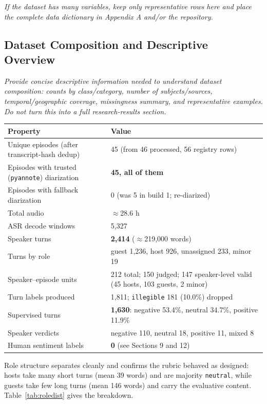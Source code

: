 \documentclass[11pt,a4paper]{article}
\newcommand{\thd}[1]{\textbf{\sffamily\small #1}}          %
\begin{document}
\emph{\small If the dataset has many variables, keep only representative rows here and place the
complete data dictionary in Appendix A and/or the repository.}

\subsection{Dataset Composition and Descriptive Overview}

\emph{\small Provide concise descriptive information needed to understand dataset composition:
counts by class/category, number of subjects/sources, temporal/geographic coverage, missingness
summary, and representative examples. Do not turn this into a full research-results section.}

\begin{tabularx}{\textwidth}{|L{6.6cm}|Y|}
\hline
\thd{Property} & \thd{Value} \\ \hline
Unique episodes (after transcript-hash dedup) & 45 (from 46 processed, 56 registry rows) \\ \hline
Episodes with trusted (\texttt{pyannote}) diarization & \textbf{45, all of them} \\ \hline
Episodes with fallback diarization & 0 (was 5 in build 1; re-diarized) \\ \hline
Total audio & $\approx$28.6 h \\ \hline
ASR decode windows & 5{,}327 \\ \hline
Speaker turns & \textbf{2{,}414} ($\approx$219{,}000 words) \\ \hline
Turns by role & guest 1{,}236, host 926, unassigned 233, minor 19 \\ \hline
Speaker--episode units & 212 total; 150 judged; 147 speaker-level valid (45 hosts, 103 guests, 2 minor) \\ \hline
Turn labels produced & 1{,}811; \texttt{illegible} 181 (10.0\%) dropped \\ \hline
Supervised turns & \textbf{1{,}630}: negative 53.4\%, neutral 34.7\%, positive 11.9\% \\ \hline
Speaker verdicts & negative 110, neutral 18, positive 11, mixed 8 \\ \hline
Human sentiment labels & \textbf{0} (see Sections 9 and 12) \\ \hline
\end{tabularx}

\vspace{4pt}
Role structure separates cleanly and confirms the rubric behaved as designed: hosts take many
short turns (mean 39 words) and are majority \texttt{neutral}, while guests take few long turns
(mean 146 words) and carry the evaluative content. Table~\ref{tab:roledist} gives the breakdown.
\end{document}
